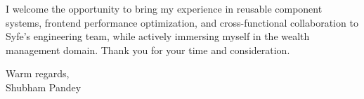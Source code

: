 \documentclass[a4paper,10pt]{article}
\begin{document}
\vspace{8pt}
I welcome the opportunity to bring my experience in reusable component systems, frontend performance optimization, and cross-functional collaboration to Syfe's engineering team, while actively immersing myself in the wealth management domain. Thank you for your time and consideration.

\vspace{12pt}
Warm regards,\\[4pt]
Shubham Pandey
\end{document}

